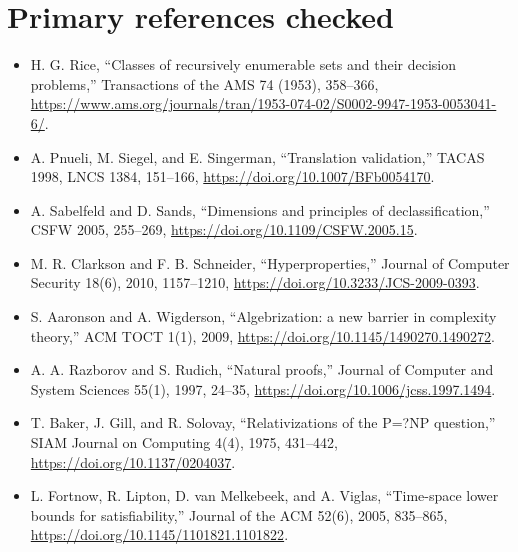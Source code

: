 \documentclass[11pt]{article}
\begin{document}
\section*{Primary references checked}
\begin{itemize}
\item H. G. Rice, ``Classes of recursively enumerable sets and their decision
problems,'' Transactions of the AMS 74 (1953), 358--366,
\url{https://www.ams.org/journals/tran/1953-074-02/S0002-9947-1953-0053041-6/}.
\item A. Pnueli, M. Siegel, and E. Singerman, ``Translation validation,''
TACAS 1998, LNCS 1384, 151--166,
\url{https://doi.org/10.1007/BFb0054170}.
\item A. Sabelfeld and D. Sands, ``Dimensions and principles of
declassification,'' CSFW 2005, 255--269,
\url{https://doi.org/10.1109/CSFW.2005.15}.
\item M. R. Clarkson and F. B. Schneider, ``Hyperproperties,'' Journal of
Computer Security 18(6), 2010, 1157--1210,
\url{https://doi.org/10.3233/JCS-2009-0393}.
\item S. Aaronson and A. Wigderson, ``Algebrization: a new barrier in
complexity theory,'' ACM TOCT 1(1), 2009,
\url{https://doi.org/10.1145/1490270.1490272}.
\item A. A. Razborov and S. Rudich, ``Natural proofs,'' Journal of Computer
and System Sciences 55(1), 1997, 24--35,
\url{https://doi.org/10.1006/jcss.1997.1494}.
\item T. Baker, J. Gill, and R. Solovay, ``Relativizations of the P=?NP
question,'' SIAM Journal on Computing 4(4), 1975, 431--442,
\url{https://doi.org/10.1137/0204037}.
\item L. Fortnow, R. Lipton, D. van Melkebeek, and A. Viglas,
``Time-space lower bounds for satisfiability,'' Journal of the ACM 52(6),
2005, 835--865, \url{https://doi.org/10.1145/1101821.1101822}.
\end{itemize}

\end{document}
